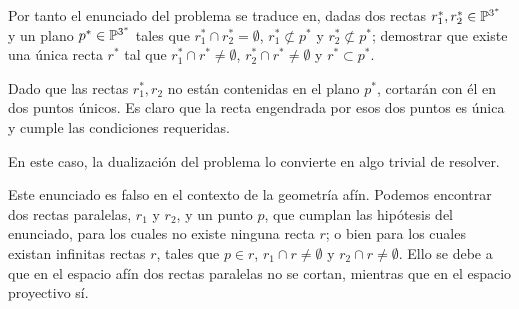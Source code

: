 \begin{exa}
\begin{enumerate}
		Por tanto el enunciado del problema se traduce en, dadas dos rectas $r_1^*, r_2^*\in\mathbb{P}^{3^*}$ y un plano $p^*\in\mathbb{P}^{3^*}$ tales que $r_1^*\cap r_2^*=\emptyset$, $r_1^*\not\subset p^*$ y $r_2^*\not\subset p^*$; demostrar que existe una única recta $r^*$ tal que $r_1^*\cap r^*\not=\emptyset$, $r_2^*\cap r^*\not=\emptyset$ y $r^*\subset p^*$.
		
		Dado que las rectas $r_1^*, r_2$ no están contenidas en el plano $p^*$, cortarán con él en dos puntos únicos. Es claro que la recta engendrada por esos dos puntos es única y cumple las condiciones requeridas.
	\end{enumerate}
	En este caso, la dualización del problema lo convierte en algo trivial de resolver.
\end{exa}
\begin{obs}
	Este enunciado es falso en el contexto de la geometría afín. Podemos encontrar dos rectas paralelas, $r_1$ y $r_2$, y un punto $p$, que cumplan las hipótesis del enunciado, para los cuales no existe ninguna recta $r$; o bien para los cuales existan infinitas rectas $r$, tales que $p\in r$, $r_1\cap r\not=\emptyset$ y $r_2\cap r\not=\emptyset$. Ello se debe a que en el espacio afín dos rectas paralelas no se cortan, mientras que en el espacio proyectivo sí.
\end{obs}